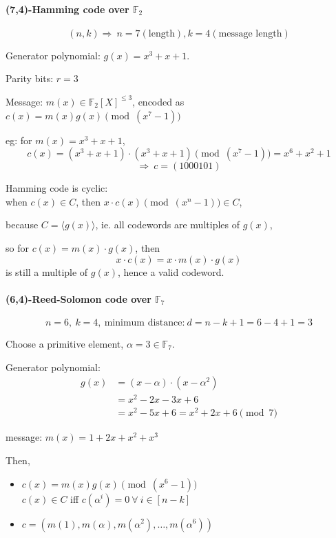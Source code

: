 \documentclass{article}
\theoremstyle{definition}
\begin{document}
\paragraph{(7,4)-Hamming code over $\mathbb{F}_2$}

$$(n, k) \Longrightarrow~ n=7 (\text{length}), k=4 (\text{message length})$$

Generator polynomial: $g(x) = x^3 + x +1$.

Parity bits: $r=3$

Message: $m(x) \in \mathbb{F}_2[X]^{\leq 3}$, encoded as $c(x) = m(x) g(x) \pmod{(x^7-1)}$

eg: for $m(x) = x^3 + x + 1$,
$$c(x) = (x^3 + x +1) \cdot (x^3 +x+1) \pmod({x^7-1}) = x^6 + x^2 + 1$$
$$\Longrightarrow~ c=(1000101)$$

Hamming code is cyclic:\\
when $c(x) \in C$, then $x \cdot c(x) \pmod({x^n-1}) \in C$,

because $C=\langle g(x) \rangle$, ie. all codewords are multiples of $g(x)$,

so for $c(x) = m(x) \cdot g(x)$, then
$$x \cdot c(x) = x \cdot m(x) \cdot g(x)$$
is still a multiple of $g(x)$, hence a valid codeword.


\paragraph{(6,4)-Reed-Solomon code over $\mathbb{F}_7$}

$$n=6,~ k=4,~ \text{minimum distance:}~ d=n-k+1 = 6-4+1 = 3$$

Choose a primitive element, $\alpha=3 \in \mathbb{F}_7$.

Generator polynomial:
\begin{align*}
  g(x) &= (x-\alpha) \cdot (x - \alpha^2)\\
       &= x^2 -2x -3x +6\\
       &= x^2 -5x +6 = x^2 +2x +6 \pmod{7}
\end{align*}

message: $m(x) = 1 + 2x + x^2 + x^3$

Then,
\begin{itemize}
  \item[cyclic form:] $c(x) = m(x) g(x) \pmod{(x^6-1)}$\\
    $c(x) \in C$ iff $c(\alpha^i)=0 ~\forall~ i \in [n-k]$
\item[evaluation form:] $c = (m(1), m(\alpha), m(\alpha^2), \ldots, m(\alpha^6))$
\end{itemize}
\end{document}
